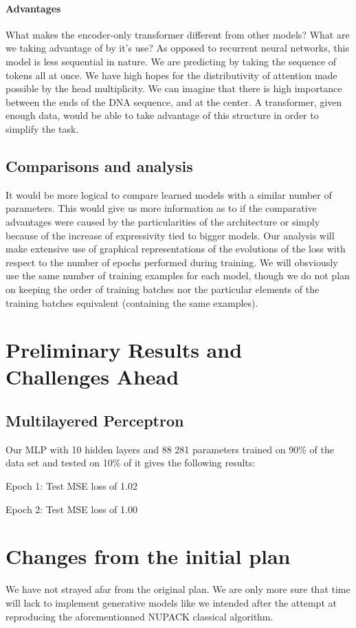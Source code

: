 \documentclass{article}
\begin{document}
\paragraph{Advantages}
What makes the encoder-only transformer different from other models? What are
we taking advantage of by it's use? As opposed to recurrent neural networks, 
this model is less sequential in nature. We are predicting by 
taking the sequence of tokens all at once. We have high hopes for the 
distributivity of attention made possible by the head multiplicity.
We can imagine that there is high importance between the ends of the DNA 
sequence, and at the center. A transformer, given enough data, would 
be able to take advantage of this structure in order to simplify the task.


\subsection{Comparisons and analysis}
It would be more logical to compare learned models with a similar 
number of parameters. This would give us more information as 
to if the comparative advantages were caused by the particularities 
of the architecture or simply because of the increase of expressivity 
tied to bigger models. Our analysis will make extensive use of graphical 
representations of the evolutions of the loss with respect to the number 
of epochs performed during training. We will obsviously use the same number 
of training examples for each model, though we do not plan on keeping 
the order of training batches nor the particular elements of the training 
batches equivalent (containing the same examples).

\section{Preliminary Results and Challenges Ahead}

\subsection{Multilayered Perceptron}
Our MLP with 10 hidden layers and 88 281 parameters trained on 90\% of the data set and tested on 10\% of it gives the following results:

Epoch 1: Test MSE loss of 1.02

Epoch 2: Test MSE loss of 1.00
\section{Changes from the initial plan}
We have not strayed afar from the original plan. We 
are only more sure that time will lack to implement 
generative models like we intended after the attempt at reproducing
the aforementionned NUPACK classical algorithm.



\end{document}
